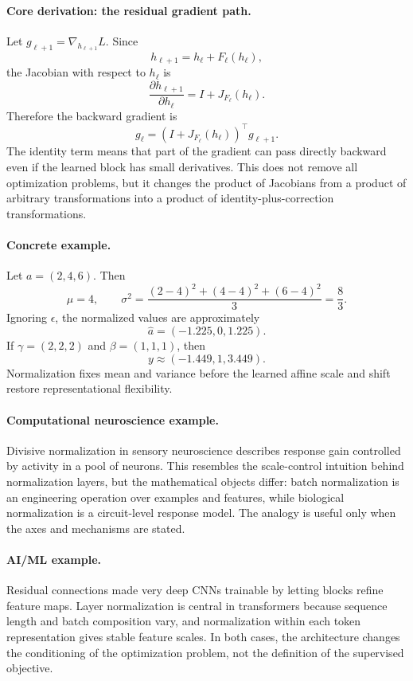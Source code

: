 \paragraph{Core derivation: the residual gradient path.}
Let \(g_{\ell+1}=\nabla_{h_{\ell+1}}L\). Since
\[
h_{\ell+1}=h_\ell+F_\ell(h_\ell),
\]
the Jacobian with respect to \(h_\ell\) is
\[
\frac{\partial h_{\ell+1}}{\partial h_\ell}
=I+J_{F_\ell}(h_\ell).
\]
Therefore the backward gradient is
\[
\boxed{
g_\ell
=\left(I+J_{F_\ell}(h_\ell)\right)^\top g_{\ell+1}.
}
\]
The identity term means that part of the gradient can pass directly backward even if the learned block has small derivatives. This does not remove all optimization problems, but it changes the product of Jacobians from a product of arbitrary transformations into a product of identity-plus-correction transformations.

\paragraph{Concrete example.}
Let \(a=(2,4,6)\). Then
\[
\mu=4,\qquad
\sigma^2=\frac{(2-4)^2+(4-4)^2+(6-4)^2}{3}=\frac83.
\]
Ignoring \(\epsilon\), the normalized values are approximately
\[
\widehat a=(-1.225,0,1.225).
\]
If \(\gamma=(2,2,2)\) and \(\beta=(1,1,1)\), then
\[
y\approx(-1.449,1,3.449).
\]
Normalization fixes mean and variance before the learned affine scale and shift restore representational flexibility.

\paragraph{Computational neuroscience example.}
Divisive normalization in sensory neuroscience describes response gain controlled by activity in a pool of neurons. This resembles the scale-control intuition behind normalization layers, but the mathematical objects differ: batch normalization is an engineering operation over examples and features, while biological normalization is a circuit-level response model. The analogy is useful only when the axes and mechanisms are stated.

\paragraph{AI/ML example.}
Residual connections made very deep CNNs trainable by letting blocks refine feature maps. Layer normalization is central in transformers because sequence length and batch composition vary, and normalization within each token representation gives stable feature scales. In both cases, the architecture changes the conditioning of the optimization problem, not the definition of the supervised objective.

